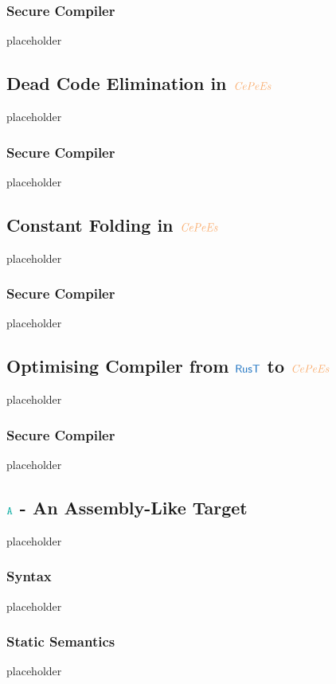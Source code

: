 \documentclass[a4paper,12pt]{article}
\begin{document}
\subsubsection{Secure Compiler}\label{subsec-improved-rust-to-cepees-seccomp}
placeholder

\subsection{Dead Code Elimination in $\irl{CePeEs}$}\label{subsec-dce-in-cepees}
placeholder
\subsubsection{Secure Compiler}\label{subsec-dce-cepees-seccomp}
placeholder

\subsection{Constant Folding in $\irl{CePeEs}$}\label{subsec-cf-in-cepees}
placeholder
\subsubsection{Secure Compiler}\label{subsec-cf-cepees-seccomp}
placeholder

\subsection{Optimising Compiler from $\src{RusT}$ to $\irl{CePeEs}$}\label{subsec-optimising-rust-to-cepees}
placeholder
\subsubsection{Secure Compiler}\label{subsec-optimising-rust-to-cepees-seccomp}
placeholder


\subsection{$\obj{A}$ - An Assembly-Like Target}\label{subsec-a}
placeholder
\subsubsection{Syntax}\label{subsec-a-syntax}
placeholder
\subsubsection{Static Semantics}\label{subsec-a-static}
placeholder
\end{document}
